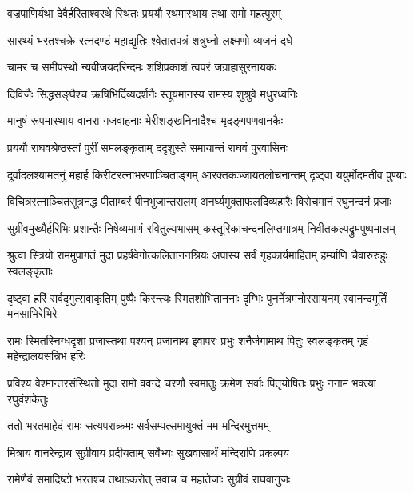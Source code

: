 \twolineshloka
{वज्रपाणिर्यथा देवैर्हरिताश्वरथे स्थितः}
{प्रययौ रथमास्थाय तथा रामो महत्पुरम्} %

\twolineshloka
{सारथ्यं भरतश्चक्रे रत्नदण्डं महाद्युतिः}
{श्वेतातपत्रं शत्रुघ्नो लक्ष्मणो व्यजनं दधे} %

\twolineshloka
{चामरं च समीपस्थो न्यवीजयदरिन्दमः}
{शशिप्रकाशं त्वपरं जग्राहासुरनायकः} %

\twolineshloka
{दिविजैः सिद्धसङ्घैश्च ऋषिभिर्दिव्यदर्शनैः}
{स्तूयमानस्य रामस्य शुश्रुवे मधुरध्वनिः} %

\twolineshloka
{मानुषं रूपमास्थाय वानरा गजवाहनाः}
{भेरीशङ्खनिनादैश्च मृदङ्गपणवानकैः} %

\twolineshloka
{प्रययौ राघवश्रेष्ठस्तां पुरीं समलङ्कृताम्}
{ददृशुस्ते समायान्तं राघवं पुरवासिनः} %

\fourlineindentedshloka
{दूर्वादलश्यामतनुं महार्ह\-}
{किरीटरत्नाभरणाञ्चिताङ्गम्}
{आरक्तकञ्जायतलोचनान्तम्}
{दृष्ट्वा ययुर्मोदमतीव पुण्याः} %

\fourlineindentedshloka
{विचित्ररत्नाञ्चितसूत्रनद्ध\-}
{पीताम्बरं पीनभुजान्तरालम्}
{अनर्घ्यमुक्ताफलदिव्यहारैः}
{विरोचमानं रघुनन्दनं प्रजाः} %

\fourlineindentedshloka
{सुग्रीवमुख्यैर्हरिभिः प्रशान्तैः}
{निषेव्यमाणं रवितुल्यभासम्}
{कस्तूरिकाचन्दनलिप्तगात्रम्}
{निवीतकल्पद्रुमपुष्पमालम्} %

\fourlineindentedshloka
{श्रुत्वा स्त्रियो राममुपागतं मुदा}
{प्रहर्षवेगोत्कलिताननश्रियः}
{अपास्य सर्वं गृहकार्यमाहितम्}
{हर्म्याणि चैवारुरुहुः स्वलङ्कृताः} %

\fourlineindentedshloka
{दृष्ट्वा हरिं सर्वदृगुत्सवाकृतिम्}
{पुष्पैः किरन्त्यः स्मितशोभिताननाः}
{दृग्भिः पुनर्नेत्रमनोरसायनम्}
{स्वानन्दमूर्तिं मनसाभिरेभिरे} %

\fourlineindentedshloka
{रामः स्मितस्निग्धदृशा प्रजास्तथा}
{पश्यन् प्रजानाथ इवापरः प्रभुः}
{शनैर्जगामाथ पितुः स्वलङ्कृतम्}
{गृहं महेन्द्रालयसन्निभं हरिः} %

\fourlineindentedshloka
{प्रविश्य वेश्मान्तरसंस्थितो मुदा}
{रामो ववन्दे चरणौ स्वमातुः}
{क्रमेण सर्वाः पितृयोषितः प्रभुः}
{ननाम भक्त्या रघुवंशकेतुः} %

\twolineshloka
{ततो भरतमाहेदं रामः सत्यपराक्रमः}
{सर्वसम्पत्समायुक्तं मम मन्दिरमुत्तमम्} %

\twolineshloka
{मित्राय वानरेन्द्राय सुग्रीवाय प्रदीयताम्}
{सर्वेभ्यः सुखवासार्थं मन्दिराणि प्रकल्पय} %

\twolineshloka
{रामेणैवं समादिष्टो भरतश्च तथाऽकरोत्}
{उवाच च महातेजाः सुग्रीवं राघवानुजः} %


